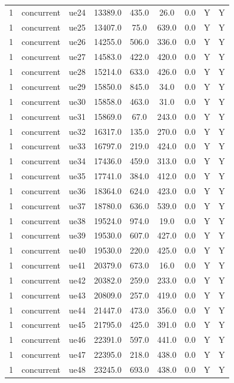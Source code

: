 \begin{table}[ht]
\begin{tabular}{|c|c|c|c|c|c|c|c|c|}
1 & concurrent & ue24 & 13389.0 & 435.0 & 26.0 & 0.0 & Y & Y \\
1 & concurrent & ue25 & 13407.0 & 75.0 & 639.0 & 0.0 & Y & Y \\
1 & concurrent & ue26 & 14255.0 & 506.0 & 336.0 & 0.0 & Y & Y \\
1 & concurrent & ue27 & 14583.0 & 422.0 & 420.0 & 0.0 & Y & Y \\
1 & concurrent & ue28 & 15214.0 & 633.0 & 426.0 & 0.0 & Y & Y \\
1 & concurrent & ue29 & 15850.0 & 845.0 & 34.0 & 0.0 & Y & Y \\
1 & concurrent & ue30 & 15858.0 & 463.0 & 31.0 & 0.0 & Y & Y \\
1 & concurrent & ue31 & 15869.0 & 67.0 & 243.0 & 0.0 & Y & Y \\
1 & concurrent & ue32 & 16317.0 & 135.0 & 270.0 & 0.0 & Y & Y \\
1 & concurrent & ue33 & 16797.0 & 219.0 & 424.0 & 0.0 & Y & Y \\
1 & concurrent & ue34 & 17436.0 & 459.0 & 313.0 & 0.0 & Y & Y \\
1 & concurrent & ue35 & 17741.0 & 384.0 & 412.0 & 0.0 & Y & Y \\
1 & concurrent & ue36 & 18364.0 & 624.0 & 423.0 & 0.0 & Y & Y \\
1 & concurrent & ue37 & 18780.0 & 636.0 & 539.0 & 0.0 & Y & Y \\
1 & concurrent & ue38 & 19524.0 & 974.0 & 19.0 & 0.0 & Y & Y \\
1 & concurrent & ue39 & 19530.0 & 607.0 & 427.0 & 0.0 & Y & Y \\
1 & concurrent & ue40 & 19530.0 & 220.0 & 425.0 & 0.0 & Y & Y \\
1 & concurrent & ue41 & 20379.0 & 673.0 & 16.0 & 0.0 & Y & Y \\
1 & concurrent & ue42 & 20382.0 & 259.0 & 233.0 & 0.0 & Y & Y \\
1 & concurrent & ue43 & 20809.0 & 257.0 & 419.0 & 0.0 & Y & Y \\
1 & concurrent & ue44 & 21447.0 & 473.0 & 356.0 & 0.0 & Y & Y \\
1 & concurrent & ue45 & 21795.0 & 425.0 & 391.0 & 0.0 & Y & Y \\
1 & concurrent & ue46 & 22391.0 & 597.0 & 441.0 & 0.0 & Y & Y \\
1 & concurrent & ue47 & 22395.0 & 218.0 & 438.0 & 0.0 & Y & Y \\
1 & concurrent & ue48 & 23245.0 & 693.0 & 438.0 & 0.0 & Y & Y \\

\end{tabular}
\end{table}
